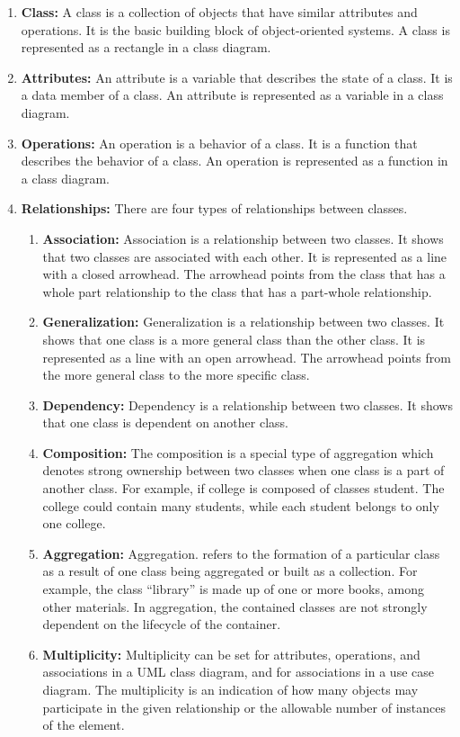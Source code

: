 \documentclass[11pt]{article}
\begin{document}
\begin{enumerate}
	\item \textbf{Class:} A class is a collection of objects that have similar attributes and operations. It is the basic building block of object-oriented systems. A class is represented as a rectangle in a class diagram.
	\item \textbf{Attributes:} An attribute is a variable that describes the state of a class. It is a data member of a class. An attribute is represented as a variable in a class diagram.
	\item \textbf{Operations:} An operation is a behavior of a class. It is a function that describes the behavior of a class. An operation is represented as a function in a class diagram.
	\item \textbf{Relationships:} There are four types of relationships between classes.
	      \begin{enumerate}
		      \item \textbf{Association:} Association is a relationship between two classes. It shows that two classes are associated with each other. It is represented as a line with a closed arrowhead. The arrowhead points from the class that has a whole part relationship to the class that has a part-whole relationship.
		      \item \textbf{Generalization:} Generalization is a relationship between two classes. It shows that one class is a more general class than the other class. It is represented as a line with an open arrowhead. The arrowhead points from the more general class to the more specific class.
		      \item \textbf{Dependency:} Dependency is a relationship between two classes. It shows that one class is dependent on another class.
		      \item \textbf{Composition: } The composition is a special type of aggregation which denotes strong ownership between two classes when one class is a part of another class. For example, if college is composed of classes student. The college could contain many students, while each student belongs to only one college.
		      \item \textbf{Aggregation: } Aggregation. refers to the formation of a particular class as a result of one class being aggregated or built as a collection. For example, the class “library” is made up of one or more books, among other materials. In aggregation, the contained classes are not strongly dependent on the lifecycle of the container.
		      \item \textbf{Multiplicity: } Multiplicity can be set for attributes, operations, and associations in a UML class diagram, and for associations in a use case diagram. The multiplicity is an indication of how many objects may participate in the given relationship or the allowable number of instances of the element.
	      \end{enumerate}
\end{enumerate}
\end{document}
